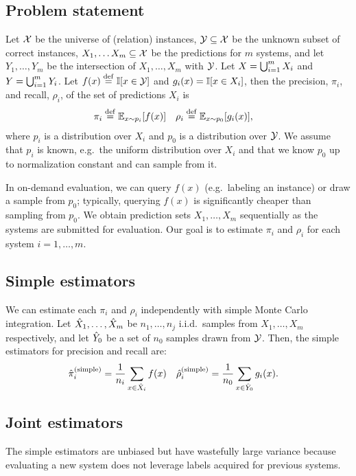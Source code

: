 \subsection{Problem statement}
Let $\mathcal{X}$ be the universe of %
(relation) instances,
  $\mathcal{Y} \subseteq \mathcal{X}$ be the unknown subset of correct instances,
  $X_1, \ldots X_m \subseteq \mathcal{X}$ be the predictions for $m$ systems,
  and let $Y_1, \ldots, Y_m$ be the intersection of $X_1, \ldots, X_m$ with $\mathcal{Y}$.
Let $X = \bigcup_{i=1}^m X_i$ and $Y = \bigcup_{i=1}^m Y_i$.
Let $f(x) \stackrel{\rm def}{=} \mathbb{I}[x \in \mathcal{Y}]$ and $g_i(x) = \mathbb{I}[x \in X_i]$, then the precision, $\pi_i$, and recall, $\rho_i$, of the set of predictions $X_i$ is
\begin{align*}
  \pi_i  &\stackrel{\rm def}{=} \mathbb{E}_{x \sim p_i}[f(x)] &
  \rho_i &\stackrel{\rm def}{=} \mathbb{E}_{x \sim p_0}[g_i(x)],
\end{align*}
where $p_i$ is a distribution over $X_i$ and $p_0$ is a distribution over $\mathcal{Y}$.
We assume that $p_i$ is known, e.g.\, the uniform distribution over $X_i$
and that we know $p_0$ up to normalization constant and can sample from it.

In on-demand evaluation, we can query $f(x)$ (e.g.\, labeling an instance) or draw a sample from $p_0$;
typically, querying $f(x)$ is significantly cheaper than sampling from $p_0$.
We obtain prediction sets $X_1, \ldots, X_m$ sequentially as the systems are submitted for evaluation.
Our goal is to estimate $\pi_i$ and $\rho_i$ for each system $i = 1, \dots, m$.

\subsection{Simple estimators}
We can estimate each $\pi_i$ and $\rho_i$ independently with simple Monte Carlo integration. %
Let ${\hat{X}}_1, \ldots, {\hat{X}}_m$ be $n_1, \ldots, n_j$ i.i.d.~samples from $X_1, \ldots, X_m$ respectively, and let ${\hat{Y}}_0$ be a set of $n_0$ samples drawn from $\mathcal{Y}$.
Then, the simple estimators for precision and recall are:
\begin{align}
  {\hat{\pi}}_i^{\text{(simple)}} &= \frac1{n_i} \sum_{x \in {\hat{X}}_i} f(x) & {\hat{\rho}}_i^{\text{(simple)}} &= \frac1{n_0} \sum_{x \in {\hat{Y}}_0} g_i(x).
\end{align}

\subsection{Joint estimators}
The simple estimators are unbiased but have wastefully large variance
because evaluating a new system does not leverage labels acquired for previous
systems.  %

